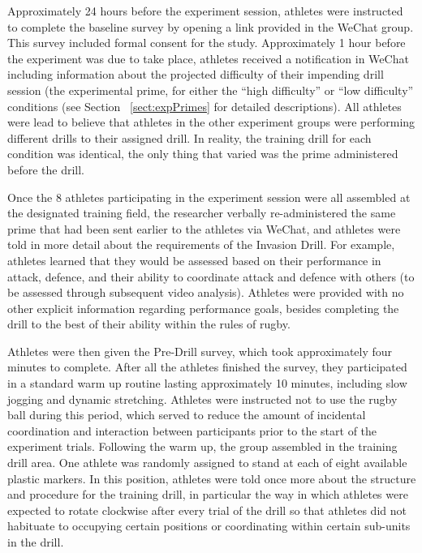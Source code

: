 Approximately 24 hours before the experiment session, athletes were instructed to complete the baseline survey by opening a link provided in the WeChat group.  This survey included formal consent for the study.  Approximately 1 hour before the experiment was due to take place, athletes received a notification in WeChat including information about the projected difficulty of their impending drill session (the experimental prime, for either the ``high difficulty'' or ``low difficulty'' conditions (see Section ~\ref{sect:expPrimes} for detailed descriptions).   All athletes were lead to believe that athletes in the other experiment groups were performing different drills to their assigned drill.  In reality, the training drill for each condition was identical, the only thing that varied was the prime administered before the drill.

Once the 8 athletes participating in the experiment session were all assembled at the designated training field, the researcher verbally re-administered the same prime that had been sent earlier to the athletes via WeChat, and athletes were told in more detail about the requirements of the Invasion Drill.  For example, athletes learned that they would be assessed based on their performance in attack, defence, and their ability to coordinate attack and defence with others (to be assessed through subsequent video analysis).  Athletes were provided with no other explicit information regarding performance goals, besides completing the drill to the best of their ability within the rules of rugby.


Athletes were then given the Pre-Drill survey, which took approximately four minutes to complete.  After all the athletes finished the survey, they participated in a standard warm up routine lasting approximately 10 minutes, including slow jogging and dynamic stretching.  Athletes were instructed not to use the rugby ball during this period, which served to reduce the amount of incidental coordination and interaction between participants prior to the start of the experiment trials.  Following the warm up, the group assembled in the training drill area.  One athlete was randomly assigned to stand at each of eight available plastic markers.  In this position, athletes were told once more about the structure and procedure for the training drill, in particular the way in which athletes were expected to rotate clockwise after every trial of the drill so that athletes did not habituate to occupying certain positions or coordinating within certain sub-units in the drill.

